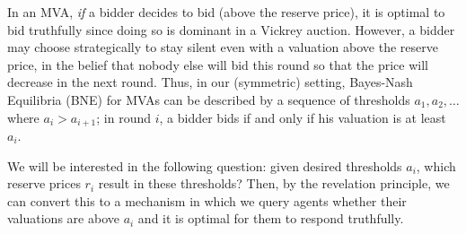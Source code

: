 In an MVA, {\em if} a bidder decides to bid (above the reserve price), it
is optimal to bid truthfully since doing so is dominant in a Vickrey auction.
However, a bidder may choose strategically to stay silent even with a
valuation above the reserve price, in the belief that nobody else will bid this
round so that the price will decrease in the next round.
Thus, in our (symmetric) setting, Bayes-Nash
Equilibria (BNE)
 for MVAs can be described by a sequence of thresholds $a_1, a_2,
\ldots$ where $a_i > a_{i+1}$; in round $i$, a bidder bids if and only
if his valuation is at least $a_i$.


We will be interested in the following question: given desired thresholds
$a_i$, which reserve prices $r_i$ result in these thresholds?  Then, by the
revelation principle, we can convert this to a mechanism in which we query
agents whether their valuations are above $a_i$ and it is optimal for them
to respond truthfully.


